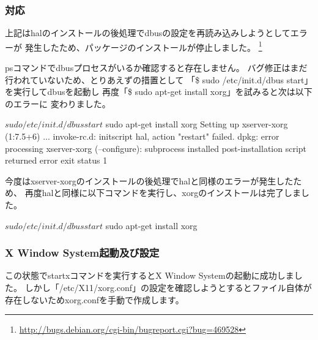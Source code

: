 \documentclass[mingoth,a4paper]{jsarticle}
\begin{document}

\subsubsection{対応}

上記はhalのインストールの後処理でdbusの設定を再読み込みしようとしてエラーが
発生したため、パッケージのインストールが停止しました。
\footnote{\url{http://bugs.debian.org/cgi-bin/bugreport.cgi?bug=469528}}

psコマンドでdbusプロセスがいるか確認すると存在しません。
バグ修正はまだ行われていないため、とりあえずの措置として
「{\$} sudo /etc/init.d/dbus start」を実行してdbusを起動し
再度「{\$} sudo apt-get install xorg」を試みると次は以下のエラーに
変わりました。

\begin{commandline}
$ sudo /etc/init.d/dbus start
$ sudo apt-get install xorg
Setting up xserver-xorg (1:7.5+6) ...
invoke-rc.d: initscript hal, action "restart" failed.
dpkg: error processing xserver-xorg (--configure):
subprocess installed post-installation script returned error exit status 1
\end{commandline}

今度はxserver-xorgのインストールの後処理でhalと同様のエラーが発生したため、
再度halと同様に以下コマンドを実行し、xorgのインストールは完了しました。

\begin{commandline}
$ sudo /etc/init.d/dbus start
$ sudo apt-get install xorg
\end{commandline}

\subsubsection{X Window System起動及び設定}

この状態でstartxコマンドを実行するとX Window Systemの起動に成功しました。
しかし「/etc/X11/xorg.conf」の設定を確認しようとするとファイル自体が
存在しないためxorg.confを手動で作成します。
\end{document}
